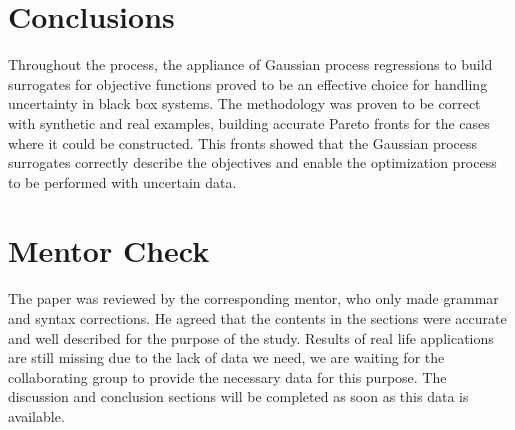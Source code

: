 \documentclass{article}
\begin{document}
\section{Conclusions}

Throughout the process, the appliance of Gaussian process regressions to build surrogates for objective functions proved to be an effective choice for handling uncertainty in black box systems. The methodology was proven to be correct with synthetic and real examples, building accurate Pareto fronts for the cases where it could be constructed. This fronts showed that the Gaussian process surrogates correctly describe the objectives and enable the optimization process to be performed with uncertain data.




\section{Mentor Check}

The paper was reviewed by the corresponding mentor, who only made grammar and syntax corrections. He agreed that the contents in the sections were accurate and well described for the purpose of the study. Results of real life applications are still missing due to the lack of data we need, we are waiting for the collaborating group to provide the necessary data for this purpose. The discussion and conclusion sections will be completed as soon as this data is available.
\end{document}
